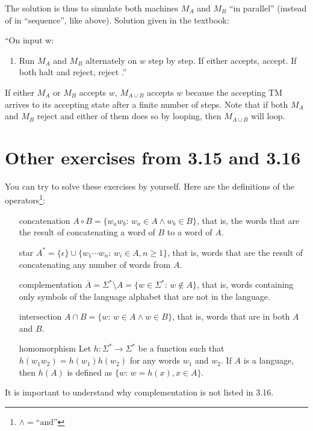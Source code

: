 \documentclass{article}
\newcommand{\st}{\colon\,}
\newcommand{\TM}{TM}
\begin{document}
The solution is thus to simulate both machines \(M_A\) and \(M_B\) ``in
parallel'' (instead of in ``sequence'', like above). Solution given in the textbook:

``On input w:
\begin{enumerate}
	\item Run \(M_A\) and \(M_B\) alternately on \(w\) step by step. If either accepts,
accept. If both halt and reject, reject .''
\end{enumerate}

If either \(M_A\) or \(M_B\) accepts \(w\), \(M_{A \cup B}\) accepts \(w\)
because the accepting \TM{} arrives to its
accepting state after a finite number of steps. Note that if both \(M_A\) and
\(M_B\) reject and either of them does so by looping, then \(M_{A \cup B}\)
will loop.

\section*{Other exercises from 3.15 and 3.16}

You can try to solve these exercises by yourself. Here are the definitions of
the operators\footnote{\(\land = \text{``and''}\)}:
\begin{itemize}
\item[concatenation] \( A \circ B = \{ w_a w_b \st w_a \in A \land w_b \in
	B\}\), that is, the
	words that are the result of concatenating a word of \(B\) to a word of
	\(A\).
\item[star] \( A^* = \{ \epsilon \} \cup \{ w_1 \cdots w_n \st w_i \in A, n \ge
	1\}\), that is,
	words that are the result of concatenating any number of words from \(A\).
\item[complementation] \( \overline{A} = \Sigma^{*} \setminus A = \{ w \in \Sigma^{*} \st w \not \in A
	\}\), that is, words containing only symbols of the language alphabet that are not in the
	language.
\item[intersection] \( A \cap B = \{w \st w \in A \land w \in B\}\), that
	is, words that are in both \(A\) and \(B\).
\item[homomorphism] Let \(h \colon \Sigma^{*} \to \Sigma^{*}\)
	be a function such that \(h(w_1 w_2) = h(w_1) h(w_2)\) for any words
	\(w_1\) and \(w_2\). If \(A\) is
	a language, then \(h(A)\) is defined as \(\{ w \st w = h(x), x \in A\}\).
\end{itemize}

It is important to understand why complementation is not listed in 3.16.
\end{document}
